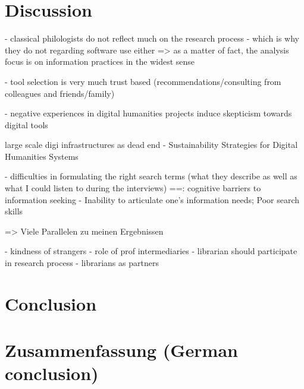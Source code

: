 \documentclass[12pt, a4paper, titlepage, oneside, abstract=true, toc=listof, toc=bibliography]{scrreprt}
\begin{document}
{%
\chapter{Discussion}

- classical philologists do not reflect much on the research process - which is why they do not regarding software use either => as a matter of fact, the analysis focus is on information practices in the widest sense


- tool selection is very much trust based (recommendations/consulting from colleagues and friends/family)

- negative experiences in digital humanities projects induce skepticism towards digital tools

\cite{Zundert2012} large scale digi infrastructures as dead end
\cite{Neuefeind2020} - Sustainability Strategies for Digital Humanities Systems

- difficulties in formulating the right search terms (what they describe as well as what I could listen to during the interviews)
==\cite{Savolainen2015a}: cognitive barriers to information seeking - Inability to articulate one’s information needs; Poor search skills


\cite{Bulger2011} => Viele Parallelen zu meinen Ergebnissen

\cite{Constant1996} - kindness of strangers
\cite{Edmond2005} - role of prof intermediaries
\cite{Gunning1978} - librarian should participate in research process
\cite{MonroeGulick2013} - librarians as partners

\chapter{Conclusion}

\chapter{Zusammenfassung (German conclusion)}

}
\end{document}
